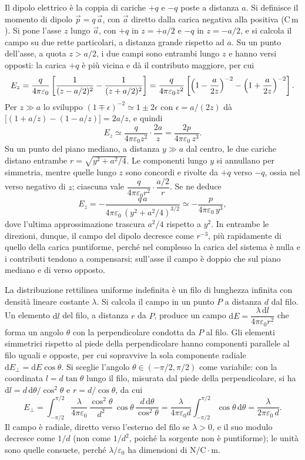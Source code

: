 \documentclass[11pt,a4paper]{article}
\newcommand{\dd}{\mathrm{d}}
\newcommand{\epz}{\varepsilon_0}
\begin{document}
Il dipolo elettrico è la coppia di cariche $+q$ e $-q$ poste a distanza $a$. Si definisce il momento di dipolo $\vec p=q\,\vec a$, con $\vec a$ diretto dalla carica negativa alla positiva ($\ensuremath{\mathrm{C\,m}}$). Si pone l'asse $z$ lungo $\vec a$, con $+q$ in $z=+a/2$ e $-q$ in $z=-a/2$, e si calcola il campo su due rette particolari, a distanza grande rispetto ad $a$. Su un punto dell'asse, a quota $z>a/2$, i due campi sono entrambi lungo $z$ e hanno versi opposti: la carica $+q$ è più vicina e dà il contributo maggiore, per cui
\[
E_z=\frac{q}{4\pi\epz}\left[\frac{1}{(z-a/2)^2}-\frac{1}{(z+a/2)^2}\right]
=\frac{q}{4\pi\epz z^2}\left[\Bigl(1-\frac{a}{2z}\Bigr)^{-2}-\Bigl(1+\frac{a}{2z}\Bigr)^{-2}\right].
\]
Per $z\gg a$ lo sviluppo $(1\mp\epsilon)^{-2}\simeq 1\pm2\epsilon$ con $\epsilon=a/(2z)$ dà $\bigl[(1+a/z)-(1-a/z)\bigr]=2a/z$, e quindi
\[
E_z\simeq\frac{q}{4\pi\epz z^2}\cdot\frac{2a}{z}=\frac{2p}{4\pi\epz\,z^3}.
\]
Su un punto del piano mediano, a distanza $y\gg a$ dal centro, le due cariche distano entrambe $r=\sqrt{y^2+a^2/4}$. Le componenti lungo $y$ si annullano per simmetria, mentre quelle lungo $z$ sono concordi e rivolte da $+q$ verso $-q$, ossia nel verso negativo di $z$; ciascuna vale $\dfrac{q}{4\pi\epz r^2}\cdot\dfrac{a/2}{r}$. Se ne deduce
\[
E_z=-\frac{q\,a}{4\pi\epz\,(y^2+a^2/4)^{3/2}}\simeq-\frac{p}{4\pi\epz\,y^3},
\]
dove l'ultima approssimazione trascura $a^2/4$ rispetto a $y^2$. In entrambe le direzioni, dunque, il campo del dipolo decresce come $r^{-3}$, più rapidamente di quello della carica puntiforme, perché nel complesso la carica del sistema è nulla e i contributi tendono a compensarsi; sull'asse il campo è doppio che sul piano mediano e di verso opposto.

La distribuzione rettilinea uniforme indefinita è un filo di lunghezza infinita con densità lineare costante $\lambda$. Si calcola il campo in un punto $P$ a distanza $d$ dal filo. Un elemento $\dd l$ del filo, a distanza $r$ da $P$, produce un campo $\dd E=\dfrac{\lambda\,\dd l}{4\pi\epz r^2}$ che forma un angolo $\theta$ con la perpendicolare condotta da $P$ al filo. Gli elementi simmetrici rispetto al piede della perpendicolare hanno componenti parallele al filo uguali e opposte, per cui sopravvive la sola componente radiale $\dd E_\perp=\dd E\cos\theta$. Si sceglie l'angolo $\theta\in(-\pi/2,\pi/2)$ come variabile: con la coordinata $l=d\tan\theta$ lungo il filo, misurata dal piede della perpendicolare, si ha $\dd l=d\,\dd\theta/\cos^2\theta$ e $r=d/\cos\theta$, da cui
\[
E_\perp=\int_{-\pi/2}^{\pi/2}\frac{\lambda}{4\pi\epz}\,\frac{\cos^2\theta}{d^2}\,\cos\theta\,\frac{d\,\dd\theta}{\cos^2\theta}
=\frac{\lambda}{4\pi\epz d}\int_{-\pi/2}^{\pi/2}\cos\theta\,\dd\theta
=\frac{\lambda}{2\pi\epz\,d}.
\]
Il campo è radiale, diretto verso l'esterno del filo se $\lambda>0$, e il suo modulo decresce come $1/d$ (non come $1/d^2$, poiché la sorgente non è puntiforme); le unità sono quelle consuete, perché $\lambda/\epz$ ha dimensioni di $\ensuremath{\mathrm{N/C}}\cdot\ensuremath{\mathrm{m}}$.
\end{document}
